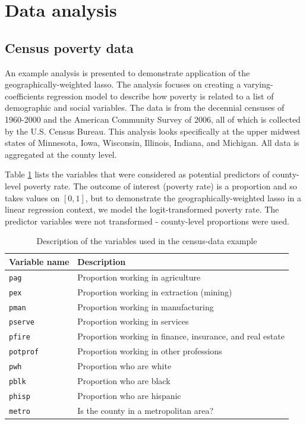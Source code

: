 \documentclass[authoryear, review, 11pt]{elsarticle}
\begin{document}
	



			
\section{Data analysis}
	\subsection{Census poverty data}
	An example analysis is presented to demonstrate application of the geographically-weighted lasso. The analysis focuses on creating a varying-coefficients regression model to describe how poverty is related to a list of demographic and social variables. The data is from the decennial censuses of 1960-2000 and the American Community Survey of 2006, all of which is collected by the U.S. Census Bureau. This analysis looks specifically at the upper midwest states of Minnesota, Iowa, Wisconsin, Illinois, Indiana, and Michigan. All data is aggregated at the county level.
	
	Table \ref{table:census-vars} lists the variables that were considered as potential predictors of county-level poverty rate. The outcome of interest (poverty rate) is a proportion and so takes values on $[0,1]$, but to demonstrate the geographically-weighted lasso in a linear regression context, we model the logit-transformed poverty rate. The predictor variables were not transformed - county-level proportions were used.
	
	\begin{table}
		\begin{center}
		\begin{tabular}{ll}
			Variable name & Description \\
			\hline
			\verb!pag! & Proportion working in agriculture\\
			\verb!pex! &  Proportion working in extraction (mining)\\
			\verb!pman! & Proportion working in manufacturing \\
			\verb!pserve! & Proportion working in services \\
			\verb!pfire! & Proportion working in finance, insurance, and real estate \\
			\verb!potprof! & Proportion working in other professions \\
			\verb!pwh! & Proportion who are white \\
			\verb!pblk! & Proportion who are black \\
			\verb!phisp! & Proportion who are hispanic \\
			\verb!metro! & Is the county in a metropolitan area?\\
		\end{tabular}
		\caption{Description of the variables used in the census-data example\label{table:census-vars}}
		\end{center}		
	\end{table}
	
\end{document}
